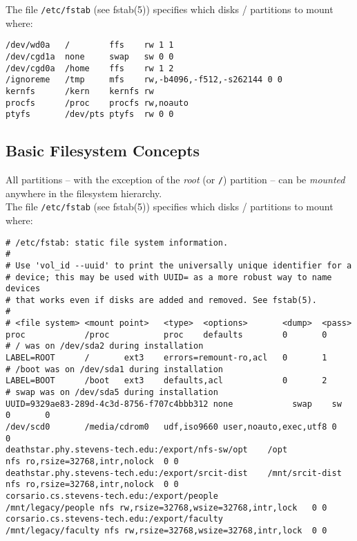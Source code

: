 \documentclass[xga]{xdvislides}
\begin{document}
The file \verb+/etc/fstab+ (see fstab(5)) specifies which disks / partitions
to mount where:
\\
\begin{verbatim}
/dev/wd0a   /        ffs    rw 1 1
/dev/cgd1a  none     swap   sw 0 0
/dev/cgd0a  /home    ffs    rw 1 2
/ignoreme   /tmp     mfs    rw,-b4096,-f512,-s262144 0 0
kernfs      /kern    kernfs rw
procfs      /proc    procfs rw,noauto
ptyfs       /dev/pts ptyfs  rw 0 0
\end{verbatim}
\Normalsize

\subsection{Basic Filesystem Concepts}
All partitions -- with the exception of the {\em root} (or \verb+/+) partition
-- can be {\em mounted} anywhere in the filesystem hierarchy.
\\

The file \verb+/etc/fstab+ (see fstab(5)) specifies which disks / partitions
to mount where:
\\
\small
\begin{verbatim}
# /etc/fstab: static file system information.
#
# Use 'vol_id --uuid' to print the universally unique identifier for a
# device; this may be used with UUID= as a more robust way to name devices
# that works even if disks are added and removed. See fstab(5).
#
# <file system> <mount point>   <type>  <options>       <dump>  <pass>
proc            /proc           proc    defaults        0       0
# / was on /dev/sda2 during installation
LABEL=ROOT      /       ext3    errors=remount-ro,acl   0       1
# /boot was on /dev/sda1 during installation
LABEL=BOOT      /boot   ext3    defaults,acl            0       2
# swap was on /dev/sda5 during installation
UUID=9329ae83-289d-4c3d-8756-f707c4bbb312 none            swap    sw
0       0
/dev/scd0       /media/cdrom0   udf,iso9660 user,noauto,exec,utf8 0       0
deathstar.phy.stevens-tech.edu:/export/nfs-sw/opt    /opt            nfs ro,rsize=32768,intr,nolock  0 0
deathstar.phy.stevens-tech.edu:/export/srcit-dist    /mnt/srcit-dist  nfs ro,rsize=32768,intr,nolock  0 0
corsario.cs.stevens-tech.edu:/export/people          /mnt/legacy/people nfs rw,rsize=32768,wsize=32768,intr,lock   0 0
corsario.cs.stevens-tech.edu:/export/faculty         /mnt/legacy/faculty nfs rw,rsize=32768,wsize=32768,intr,lock  0 0

\end{verbatim}
\Normalsize
\end{document}
